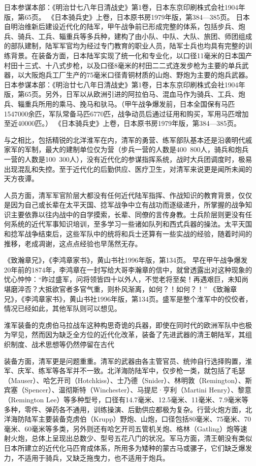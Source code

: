 \documentclass[12pt,UTF8]{ctexbook}
\begin{document}
日本参谋本部：《明治廿七八年日清战史》第1卷，日本东京印刷株式会社1904年版，第65页。
《日本骑兵史》上卷，日本原书房1979年版，第384—385页。
日本自明治维新后建设近代化的陆军，甲午战争前已形成完整的体系，包括步兵、炮兵、骑兵、工兵、辎重兵等多兵种，建构了由小队、中队、大队、旅团、师团组成的部队建制，陆军军官均为经过专门教育的职业人员，陆军士兵也均具有完整的训练背景。在装备方面，日本陆军实现了统一化和专业化，以口径11毫米的日本国产村田十三式、十八式步枪，以及口径8毫米的村田二二式连发步枪为主要的单兵武器，以大阪炮兵工厂生产的75毫米口径青铜材质的山炮、野炮为主要的炮兵武器。 日本参谋本部：《明治廿七八年日清战史》第1卷，日本东京印刷株式会社1904年版，第65页。另外，日军以从欧洲引进的阿拉伯马、混血马作为骑兵、工兵、炮兵、辎重兵所用的乘马、挽马和驮马。（甲午战争爆发前，日本全国保有马匹1547000余匹，军队常备马匹6770匹，战争动员后通过征用和购买，军用马匹增加至近40000匹。） 《日本骑兵史》上卷，日本原书房1979年版，第384—385页。

与之相比，包括精锐的北洋淮军在内，清军的勇营、练军部队基本还是沿袭明代戚家军的军制，最大的建制单位仅为营（步兵一营的人数是400~800人，骑兵和炮兵一营的人数是100~300人），没有近代化的参谋指挥系统，战时大兵团调度时，极易出现混乱和失控。至于近代化的后勤供应、医疗卫生，对清军来说更是闻所未闻的天方夜谭。

人员方面，清军军官阶层大都没有任何近代陆军指挥、作战知识的教育背景，仅仅是因为自己或长辈在太平天国、捻军战争中立有战功而逐级递升，所掌握的战争知识主要依靠以往内战中的自学摸索，长辈、同僚的言传身教。士兵阶层则更没有任何系统的近代军事知识培训，至多学习一些诸如队列和西式兵器的操法。太平天国和捻军战争结束后，这些军队中的统将和兵士还算有一些实战的经验，随着时间的推移，老成凋谢，这点点经验也早荡然无存。

《致瀚章兄》，《李鸿章家书》，黄山书社1996年版，第134页。
早在甲午战争爆发20年前的1874年，李鸿章在一封写给大哥李瀚章的信中，就曾透露出对这种现象的忧心忡忡：“昨过盛军，问将领皆四十以外人，不觉老将至矣！再遇艰巨，未知尚堪磨淬否？大抵欲官者多官气重，则朴风渐离，如何？！如何？！” 《致瀚章兄》，《李鸿章家书》，黄山书社1996年版，第134页。盛军是整个淮军中的佼佼者，情况已经如此，其他军队则可以想见。


淮军装备的克虏伯马拉战车这种构思奇诡的兵器，即使在同时代的欧洲军队中也极为罕见，然而因为缺乏全方位的近代化改革，装备了先进武器的清王朝陆军，其组织制度、战术思想等仍然停留在古代

装备方面，清军更是问题重重。清军的武器由各主管官员、统帅自行选择购置，淮军、庆军、练军等各军并不一致。北洋海防陆军中，仅步枪一类，就包括了毛瑟（Mauser）、哈乞开司（Hotchkiss）、士乃德（Snider）、林明敦（Remington）、斯宾塞（Spencer）、温彻斯特（Winchester）、马提尼·亨利（Martini Henry）、黎意（Remington Lee）等多种型号，口径有14.7毫米、12.5毫米、11毫米、7.9毫米等多种，零件、弹药各不通用，训练操演、后勤供应都极为复杂。行营火炮方面，北洋海防陆军主要装备克虏伯（Krupp）野炮、山炮，口径包括80毫米、75毫米、70毫米、60毫米等多类，另外则还有哈乞开司五管机关炮、格林（Gatling）炮等速射火炮，总体上呈现出总数少、型号五花八门的状况。军马方面，清王朝没有类似日本所建立的近代化马匹育成体系，所用多为矮种的蒙古马或骡子，它们缺乏爆发力，不适用于骑兵，又缺乏拖曳力，也不适用于炮兵。
\end{document}
